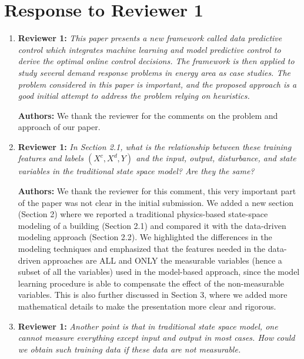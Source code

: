 \documentclass{article}
\begin{document}



\section{Response to Reviewer 1}



\begin{enumerate}

\item \textbf{Reviewer 1:} \textit{This paper presents a new framework called data predictive control which integrates machine learning and model predictive control to derive the optimal online control decisions. The framework is then applied to study several demand response problems in energy area as case studies. The problem considered in this paper is important, and the proposed approach is a good initial attempt to address the problem relying on heuristics.}



\textbf{Authors:} We thank the reviewer for the comments on the problem and approach of our paper.



\item \textbf{Reviewer 1:} \textit{In Section 2.1, what is the relationship between these training features and labels $(X^c, X^d, Y)$ and the input, output, disturbance, and state variables in the traditional state space model? Are they the same?}



\textbf{Authors:} We thank the reviewer for this comment, this very important part of the paper was not clear in the initial submission. We added a new section (Section 2) where we reported a traditional physics-based state-space modeling of a building (Section 2.1) and compared it with the data-driven modeling approach (Section 2.2). We highlighted the differences in the modeling techniques and emphasized that the features needed in the data-driven approaches are ALL and ONLY the measurable variables (hence a subset of all the variables) used in the model-based approach, since the model learning procedure is able to compensate the effect of the non-measurable variables. This is also further discussed in Section 3, where we added more mathematical details to make the presentation more clear and rigorous.



\item \textbf{Reviewer 1:} \textit{Another point is that in traditional state space model, one cannot measure everything except input and output in most cases. How could we obtain such training data if these data are not measurable.}




\end{enumerate}
\end{document}

